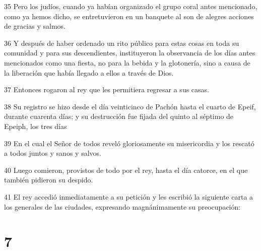 \par 35 Pero los judíos, cuando ya habían organizado el grupo coral antes mencionado, como ya hemos dicho, se entretuvieron en un banquete al son de alegres acciones de gracias y salmos.
\par 36 Y después de haber ordenado un rito público para estas cosas en toda su comunidad y para sus descendientes, instituyeron la observancia de los días antes mencionados como una fiesta, no para la bebida y la glotonería, sino a causa de la liberación que había llegado a ellos a través de Dios.
\par 37 Entonces rogaron al rey que les permitiera regresar a sus casas.
\par 38 Su registro se hizo desde el día veinticinco de Pachón hasta el cuarto de Epeif, durante cuarenta días; y su destrucción fue fijada del quinto al séptimo de Epeiph, los tres días
\par 39 En el cual el Señor de todos reveló gloriosamente su misericordia y los rescató a todos juntos y sanos y salvos.
\par 40 Luego comieron, provistos de todo por el rey, hasta el día catorce, en el que también pidieron su despido.
\par 41 El rey accedió inmediatamente a su petición y les escribió la siguiente carta a los generales de las ciudades, expresando magnánimamente su preocupación:

\chapter{7}

